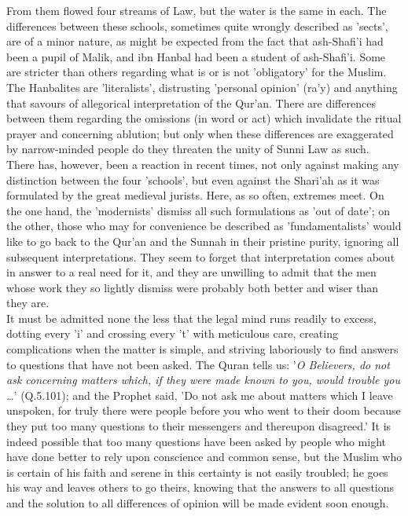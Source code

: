 \documentclass[11pt, b5paper, twoside]{book}
\begin{document}
From them flowed four streams of Law, but the water is the same in each. The differences between 
these schools, sometimes quite wrongly described as 'sects', are of a minor nature, as might be 
expected from the fact that ash-Shafi'i had been a pupil of Malik, and ibn Hanbal had been a student 
of ash-Shafi'i. Some are stricter than others regarding what is or is not 'obligatory' for the 
Muslim. The Hanbalites are 'literalists', distrusting 'personal opinion' (ra'y) and anything that 
savours of allegorical interpretation of the Qur'an. There are differences between them regarding the 
omissions (in word or act) which invalidate the ritual prayer and concerning ablution; but only when 
these differences are exaggerated by narrow-minded people do they threaten the unity of Sunni Law as 
such. \\

There has, however, been a reaction in recent times, not only against making any distinction between 
the four 'schools', but even against the Shari'ah as it was formulated by the great medieval jurists. 
Here, as so often, extremes meet. On the one hand, the 'modernists' dismiss all such formulations as 
'out of date'; on the other, those who may for convenience be described as 'fundamentalists' would 
like to go back to the Qur'an and the Sunnah in their pristine purity, ignoring all subsequent 
interpretations. They seem to forget that interpretation comes about in answer to a real need for it, 
and they are unwilling to admit that the men whose work they so lightly dismiss were probably both 
better and wiser than they are. \\

It must be admitted none the less that the legal mind runs readily to excess, dotting every 'i' and 
crossing every 't' with meticulous care, creating complications when the matter is simple, and 
striving laboriously to find answers to questions that have not been asked. The Quran tells us: '\emph{O Believers, do not ask concerning matters which, if they were made known to you, would trouble you 
\ldots{}}' (Q.5.101); and the Prophet said, 'Do not ask me about matters which I leave unspoken, for truly 
there were people before you who went to their doom because they put too many questions to their 
messengers and thereupon disagreed.' It is indeed possible that too many questions have been asked by 
people who might have done better to rely upon conscience and common sense, but the Muslim who is 
certain of his faith and serene in this certainty is not easily troubled; he goes his way and leaves 
others to go theirs, knowing that the answers to all questions and the solution to all differences of 
opinion will be made evident soon enough. \\
\end{document}
